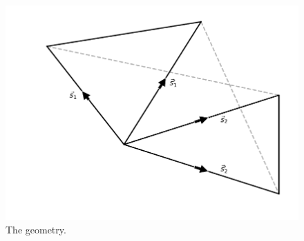 \documentclass[useAMS,usenatbib]{mn2e}
\begin{document}

\begin{figure}
    \centering
    \includegraphics[scale=0.6]{triangle.pdf}
    \caption{The geometry.}
    \label{fig:triangle}
\end{figure}
\end{document}
